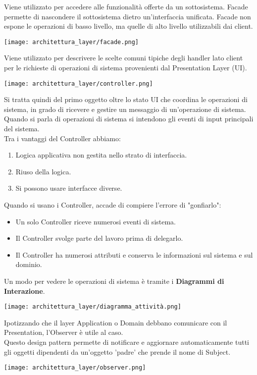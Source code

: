 {    
    Viene utilizzato per accedere alle funzionalità offerte da un sottosistema. Facade permette di nascondere il sottosistema dietro un'interfaccia
    unificata. Facade non espone le operazioni di basso livello, ma quelle di alto livello utilizzabili dai client.
    \begin{center}
        \texttt{[image: architettura\_layer/facade.png]}
    \end{center}
    \newpage
    Viene utilizzato per descrivere le scelte comuni tipiche degli handler lato client per le richieste di operazioni di sistema provenienti
    dal Presentation Layer (UI).
    \begin{center}
        \texttt{[image: architettura\_layer/controller.png]}
    \end{center}
    Si tratta quindi del primo oggetto oltre lo stato UI che coordina le operazioni di sistema, in grado di ricevere e gestire un messaggio di un'operazione
    di sistema. Quando si parla di operazioni di sistema si intendono gli eventi di input principali del sistema.
    \\
    Tra i vantaggi del Controller abbiamo:
    \begin{enumerate}
        \item Logica applicativa non gestita nello strato di interfaccia.
        \item Riuso della logica.
        \item Si possono usare interfacce diverse.
    \end{enumerate}
    Quando si usano i Controller, accade di compiere l'errore di "gonfiarlo":
    \begin{itemize}
        \item Un solo Controller riceve numerosi eventi di sistema.
        \item Il Controller svolge parte del lavoro prima di delegarlo.
        \item Il Controller ha numerosi attributi e conserva le informazioni sul sistema e sul dominio.
    \end{itemize}
    \newpage
    
    \noindent Un modo per vedere le operazioni di sistema è tramite i \textbf{Diagrammi di Interazione}.
    \begin{center}
        \texttt{[image: architettura\_layer/diagramma\_attività.png]}
    \end{center}

    Ipotizzando che il layer Application o Domain debbano comunicare con il Presentation, l'Observer è utile al caso.
    \\
    Questo design pattern permette di notificare e aggiornare automaticamente tutti gli oggetti dipendenti da un'oggetto 'padre'
    che prende il nome di Subject.
    \begin{center}
        \texttt{[image: architettura\_layer/observer.png]}
    \end{center}
    \newpage
}